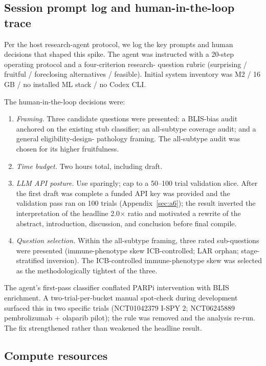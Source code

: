 \documentclass{article}
\begin{document}
\subsection{Session prompt log and human-in-the-loop trace}

Per the host research-agent protocol, we log the key prompts and
human decisions that shaped this spike.  The agent was instructed
with a 20-step operating protocol and a four-criterion research-
question rubric (surprising / fruitful / foreclosing alternatives /
feasible).  Initial system inventory was M2 / 16 GB / no installed
ML stack / no Codex CLI.

The human-in-the-loop decisions were:
\begin{enumerate}
  \item \emph{Framing.}  Three candidate questions were presented:
    a BLIS-bias audit anchored on the existing stub classifier; an
    all-subtype coverage audit; and a general eligibility-design-
    pathology framing.  The all-subtype audit was chosen for its
    higher fruitfulness.
  \item \emph{Time budget.}  Two hours total, including draft.
  \item \emph{LLM API posture.}  Use sparingly; cap to a 50--100
    trial validation slice.  After the first draft was complete a
    funded API key was provided and the validation pass ran on 100
    trials (Appendix~\ref{sec:a6}); the result inverted the
    interpretation of the headline 2.0$\times$ ratio and motivated a
    rewrite of the abstract, introduction, discussion, and
    conclusion before final compile.
  \item \emph{Question selection.}  Within the all-subtype framing,
    three rated sub-questions were presented (immune-phenotype skew
    ICB-controlled; LAR orphan; stage-stratified inversion).  The
    ICB-controlled immune-phenotype skew was selected as the
    methodologically tightest of the three.
\end{enumerate}

The agent's first-pass classifier conflated PARPi intervention with
BLIS enrichment.  A two-trial-per-bucket manual spot-check during
development surfaced this in two specific trials (NCT01042379
I-SPY 2; NCT06245889 pembrolizumab + olaparib pilot); the rule was
removed and the analysis re-run.  The fix strengthened rather than
weakened the headline result.

\subsection{Compute resources}
\end{document}
